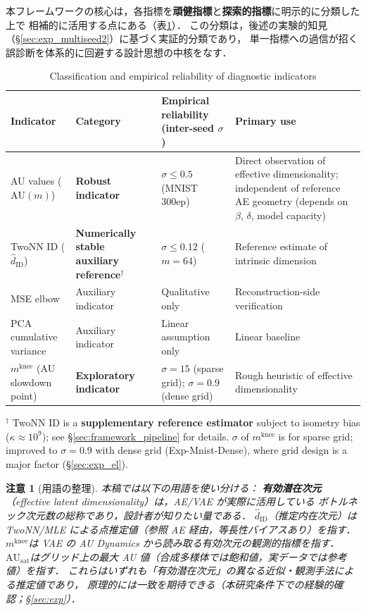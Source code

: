 \documentclass[11pt,a4paper]{jsarticle}
\newtheorem{remark}{注意}
\newcommand{\kap}{\kappa}
\newcommand{\AUsat}{\mathrm{AU}_{\mathrm{sat}}}
\newcommand{\mknee}{m^{\mathrm{knee}}}
\begin{document}
本フレームワークの核心は，各指標を\textbf{頑健指標}と\textbf{探索的指標}に明示的に分類した上で
相補的に活用する点にある（表\ref{tab:indicator_class}）．
この分類は，後述の実験的知見（§\ref{sec:exp_multiseed2}）に基づく実証的分類であり，
単一指標への過信が招く誤診断を体系的に回避する設計思想の中核をなす．

\begin{table}[H]
\centering
\caption{Classification and empirical reliability of diagnostic indicators}
\label{tab:indicator_class}
\small
\begin{tabular}{p{3.5cm}p{3.2cm}p{4.0cm}p{4.0cm}}
\toprule
Indicator & Category & Empirical reliability (inter-seed $\sigma$) & Primary use \\
\midrule
AU values ($\mathrm{AU}(m)$) & \textbf{Robust indicator} & $\sigma \leq 0.5$ (MNIST 300ep) & Direct observation of effective dimensionality; independent of reference AE geometry (depends on $\beta$, $\delta$, model capacity) \\
TwoNN ID ($\hat{d}_\mathrm{ID}$) & \textbf{Numerically stable auxiliary reference}$^\dagger$ & $\sigma \leq 0.12$ ($m=64$) & Reference estimate of intrinsic dimension \\
MSE elbow & Auxiliary indicator & Qualitative only & Reconstruction-side verification \\
PCA cumulative variance & Auxiliary indicator & Linear assumption only & Linear baseline \\
$\mknee$ (AU slowdown point) & \textbf{Exploratory indicator} & $\sigma=15$ (sparse grid); $\sigma=0.9$ (dense grid) & Rough heuristic of effective dimensionality \\
\bottomrule
\end{tabular}
\medskip
\footnotesize
$^\dagger$ TwoNN ID is a \textbf{supplementary reference estimator} subject to isometry bias ($\kap \approx 10^9$); see §\ref{sec:framework_pipeline} for details.
$\sigma$ of $\mknee$ is for sparse grid; improved to $\sigma=0.9$ with dense grid (Exp-Mnist-Dense), where grid design is a major factor (§\ref{sec:exp_el}).
\normalsize
\end{table}

\begin{remark}[用語の整理]
本稿では以下の用語を使い分ける：
\textbf{有効潜在次元}（effective latent dimensionality）は，AE/VAE が実際に活用している
ボトルネック次元数の総称であり，設計者が知りたい量である．
\textbf{$\hat{d}_\mathrm{ID}$}（推定内在次元）は TwoNN/MLE による点推定値（参照 AE 経由，等長性バイアスあり）を指す．
\textbf{$\mknee$}は VAE の AU Dynamics から読み取る有効次元の観測的指標を指す．
\textbf{$\AUsat$}はグリッド上の最大 AU 値（合成多様体では飽和値，実データでは参考値）を指す．
これらはいずれも「有効潜在次元」の異なる近似・観測手法による推定値であり，
原理的には一致を期待できる（本研究条件下での経験的確認；§\ref{sec:exp}）．
\end{remark}
\end{document}
